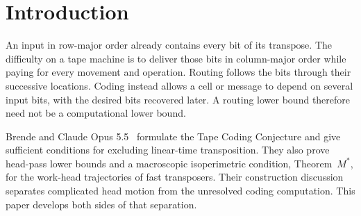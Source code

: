 \section{Introduction}\label{sec:introduction}

An input in row-major order already contains every bit of its transpose.
The difficulty on a tape machine is to deliver those bits in column-major
order while paying for every movement and operation. Routing follows the bits
through their successive locations. Coding instead allows a cell or message
to depend on several input bits, with the desired bits recovered later. A
routing lower bound therefore need not be a computational lower bound.

Brende and Claude Opus 5.5~\cite{FirstPaper2026} formulate the Tape Coding
Conjecture and give sufficient conditions for excluding linear-time
transposition. They also prove head-pass lower bounds and a macroscopic
isoperimetric condition, Theorem~$M^*$, for the work-head trajectories of fast
transposers. Their construction discussion separates complicated head motion
from the unresolved coding computation. This paper develops both sides of that
separation.

